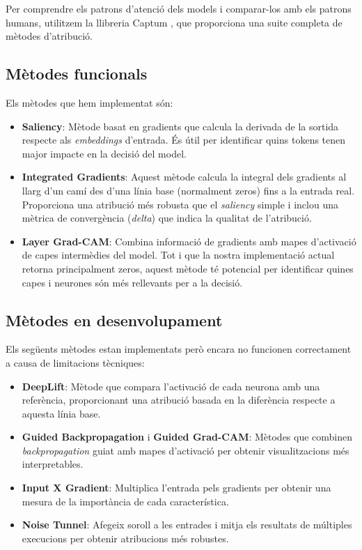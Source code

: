 Per comprendre els patrons d'atenció dels models i comparar-los amb els patrons humans, 
utilitzem la llibreria Captum \cite{captum}, que proporciona una suite completa de mètodes d'atribució.

\subsection{Mètodes funcionals}

Els mètodes que hem implementat són:

\begin{itemize}
    \item \textbf{Saliency}: Mètode basat en gradients que calcula la derivada de la sortida 
    respecte als \textit{embeddings} d'entrada. És útil per identificar quins tokens tenen 
    major impacte en la decisió del model.
    
    \item \textbf{Integrated Gradients}: Aquest mètode calcula la integral dels gradients 
    al llarg d'un camí des d'una línia base (normalment zeros) fins a la entrada real. 
    Proporciona una atribució més robusta que el \textit{saliency} simple i inclou una 
    mètrica de convergència (\textit{delta}) que indica la qualitat de l'atribució.
    
    \item \textbf{Layer Grad-CAM}: Combina informació de gradients amb mapes d'activació 
    de capes intermèdies del model. Tot i que la nostra implementació actual retorna 
    principalment zeros, aquest mètode té potencial per identificar quines capes i 
    neurones són més rellevants per a la decisió.
\end{itemize}

\subsection{Mètodes en desenvolupament}

Els següents mètodes estan implementats però encara no funcionen correctament a causa de 
limitacions tècniques:

\begin{itemize}
    \item \textbf{DeepLift}: Mètode que compara l'activació de cada neurona amb una 
    referència, proporcionant una atribució basada en la diferència respecte a aquesta 
    línia base.
    
    \item \textbf{Guided Backpropagation} i \textbf{Guided Grad-CAM}: Mètodes que 
    combinen \textit{backpropagation} guiat amb mapes d'activació per obtenir 
    visualitzacions més interpretables.
    
    \item \textbf{Input X Gradient}: Multiplica l'entrada pels gradients per obtenir 
    una mesura de la importància de cada característica.
    
    \item \textbf{Noise Tunnel}: Afegeix soroll a les entrades i mitja els resultats 
    de múltiples execucions per obtenir atribucions més robustes.
\end{itemize}

